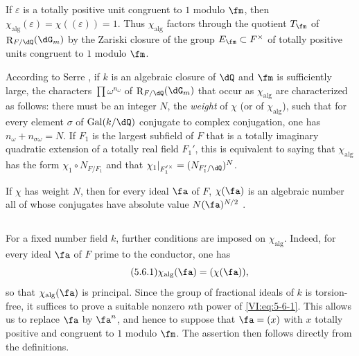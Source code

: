 \documentclass[12pt,oneside,english]{smfbook}
\DeclareMathOperator{\gal}{Gal}
\DeclareMathOperator{\res}{R} %
\newcounter{char}
\begin{document}
\subsection{}\label{VI:5-5}

If $\varepsilon$ is a totally positive unit congruent to $1$ modulo $\fm$, then $\chi_{\mathrm{alg}}(\varepsilon)=\chi((\varepsilon))=1$. Thus $\chi_{\mathrm{alg}}$ factors through the quotient $T_\fm$ of $\res_{F/\dQ}(\dG_m)$ by the Zariski closure of the group $E_\fm\subset F^\times$ of totally positive units congruent to $1$ modulo $\fm$.

According to Serre \cite[II.3]{se68}, if $k$ is an algebraic closure of $\dQ$ and $\fm$ is sufficiently large, the characters $\prod\omega^{n_\omega}$ of $\res_{F/\dQ}(\dG_m)$ that occur as $\chi_{\mathrm{alg}}$ are characterized as follows: there must be an integer $N$, the \emph{weight} of $\chi$ (or of $\chi_{\mathrm{alg}}$), such that for every element $\sigma$ of $\gal(k/\dQ)$ conjugate to complex conjugation, one has $n_\omega+n_{\sigma\omega}=N$. If $F_1$ is the largest subfield of $F$ that is a totally imaginary quadratic extension of a totally real field $F_1'$, this is equivalent to saying that $\chi_{\mathrm{alg}}$ has the form $\chi_1\circ N_{F/F_1}$ and that $\chi_1|_{F_1'^\times}=(N_{F_1'/\dQ})^N$.

If $\chi$ has weight $N$, then for every ideal $\fa$ of $F$, $\chi(\fa)$ is an algebraic number all of whose conjugates have absolute value $N(\fa)^{N/2}$ \cite[II.3, Prop.~2]{se68}.

\subsection{}\label{VI:5-6}

For a fixed number field $k$, further conditions are imposed on $\chi_{\mathrm{alg}}$. Indeed, for every ideal $\fa$ of $F$ prime to the conductor, one has
\begin{equation*}\tag{5.6.1}\label{VI:eq:5-6-1}
  \chi_\text{alg}(\fa) = (\chi(\fa)) \text{,}
\end{equation*}
so that $\chi_{\mathrm{alg}}(\fa)$ is principal. Since the group of fractional ideals of $k$ is torsion-free, it suffices to prove a suitable nonzero $n$th power of \eqref{VI:eq:5-6-1}. This allows us to replace $\fa$ by $\fa^n$, and hence to suppose that $\fa=(x)$ with $x$ totally positive and congruent to $1$ modulo $\fm$. The assertion then follows directly from the definitions.
\end{document}
